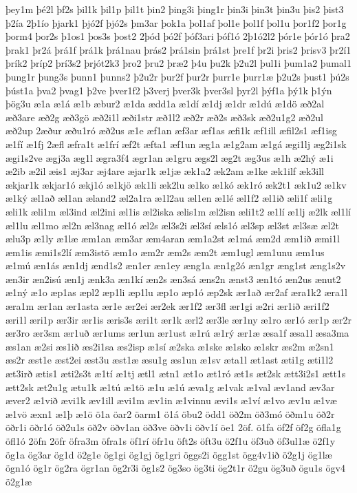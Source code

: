{þey1m
þé2l
þf2s
þil1k
þil1p
þil1t
þin2
þing3i
þing1r
þin3i
þin3t
þin3u
þis2
þist3
þ2ía
2þ1ío
þjark1
þjó2f
þjó2s
þm3ar
þok1a
þol1af
þol1e
þol1f
þol1u
þor1f2
þor1g
þorm4
þor2s
þ1os1
þos3s
þost2
2þód
þó2f
þóf3ari
þóf1ó
2þ1ó2l2
þór1e
þór1ó
þra2
þrak1
þr2á
þrá1f
þrá1k
þrá1nau
þrás2
þrá1sin
þrá1st
þre1f
þr2i
þris2
þrisv3
þr2í1
þrík2
þríp2
þrí3s2
þrjót2k3
þro2
þru2
þræ2
þ4u
þu2k
þ2u2l
þul1i
þum1a2
þumal1
þung1r
þung3s
þunn1
þunns2
þ2u2r
þur2f
þur2r
þurr1e
þurr1æ
þ2u2s
þust1
þú2s
þúst1a
þva2
þvag1
þ2ve
þver1f2
þ3verj
þver3k
þver3sl
þyr2l
þýf1a
þý1k
þ1ýn
þög3u
æ1a
æ1á
æ1b
æbur2
æ1da
ædd1a
æ1dí
æ1dj
æ1dr
æ1dú
æ1dö
æð2al
æð3are
æð2g
æð3gö
æð2i1l
æði1str
æð1l2
æð2r
æð2s
æð3sk
æð2u1g2
æð2ul
æð2up
2æður
æðu1ró
æð2us
æ1e
æf1an
æf3ar
æf1as
æfi1k
æf1ill
æfil2s1
æf1isg
æ1fí
æ1fj
2æfl
æfra1t
æ1frí
æf2t
æfta1
æf1un
æg1a
æ1g2am
æ1gá
ægi1lj
æg2i1sk
ægi1s2ve
ægj3a
æg1l
ægra3f4
ægr1an
æ1gru
ægs2l
æg2t
æg3us
æ1h
æ2hý
æ1i
æ2ib
æ2il
æis1
æj3ar
æj4are
æjar1k
æ1jæ
æk1a2
æk2am
æ1ke
æk1ilf
æk3ill
ækjar1k
ækjar1ó
ækj1ó
æ1kjö
æk1li
æk2lu
æ1ko
æ1kó
æk1ró
æk2t1
æk1u2
æ1kv
æ1ký
æl1að
æl1an
æland2
æl2a1ra
æ1l2au
æl1en
æ1lé
æl1f2
æl1ið
æli1f
æli1g
æli1k
æli1m
æl3ind
æl2ini
æl1is
æl2iska
ælis1m
æl2isn
æli1t2
æ1lí
æ1lj
æ2lk
æl1lí
æl1lu
æl1mo
æl2n
æl3nag
æl1ó
æl2s
æl3s2i
æl3sí
æls1ó
æl3sp
æl3st
æl3sæ
æl2t
ælu3p
æ1ly
æ1læ
æm1an
æm3ar
æm4aran
æm1a2st
æ1má
æm2d
æm1ið
æmi1l
æm1is
æmi1s2lí
æm3istö
æm1o
æm2r
æm2s
æm2t
æm1ugl
æm1unu
æm1us
æ1mú
æn1ás
æn1dj
ænd1s2
æn1er
æn1ey
æng1a
æn1g2ó
æn1gr
æng1st
æng1s2v
æn3ir
æn2isú
æn1j
ænk3a
æn1kí
æn2s
æn3sá
æns2n
ænst3
æn1tó
æn2us
ænut2
æ1ný
æ1o
æp1as
æpl2
æp1li
æp1lu
æp1o
æp1ó
æp2sk
ær1að
ær2af
æra1k2
æra1l
æra1m
ær1an
ær1asta
ær1e
ær2ei
ær2ek
ær1f2
ær3fl
ær1gi
æ2ri
ær1ið
æri1f2
æri1l
æri1p
ær3ir
ær1is
æris3s
æri1t
ær1k
ærl2
ær3le
ær1ny
æ1ro
ær1ó
ær1p
ær2r
ær3ro
ær3sm
ær1uð
ær1ums
ær1un
ær1ust
æ1rú
æ1rý
ær1æ
æsa1f
æsa1l
æsa3ma
æs1an
æ2si
æs1ið
æs2i1sa
æs2isp
æ1sí
æ2ska
æ1ske
æ1sko
æ1skr
æs2m
æ2sn1
æs2r
æst1e
æst2ei
æst3u
æst1æ
æsu1g
æs1un
æ1sv
æta1l
æt1ast
æti1g
æti1l2
æt3irð
ætis1
æti2s3t
æ1tí
æ1tj
ætl1
ætn1
æt1o
æt1ró
æt1s
æt2sk
ætt3i2s1
ætt1s
ætt2sk
æt2u1g
ætu1k
æ1tú
æ1tö
æ1u
æ1ú
æva1g
æ1vak
æ1val
æv1and
æv3ar
æver2
æ1við
ævi1k
æv1ill
ævi1m
æv1in
æ1vinnu
ævi1s
æ1ví
æ1vo
æv1u
æ1væ
æ1vö
æxn1
æ1þ
æ1ö
ö1a
öar2
öarm1
ö1á
öbu2
ödd1
öð2m
öð3mó
öðm1u
öð2r
öðr1i
öðr1ó
öð2u1s
öð2v
öðv1an
öð3ve
öðv1i
öðv1í
öe1
2öf.
ö1fa
öf2f
öf2g
öfla1g
öfl1ó
2öfn
2öfr
öfra3m
öfra1s
öf1rí
öfr1u
öft2s
öft3u
ö2f1u
öf3uð
öf3ul1æ
ö2f1y
ög1a
ög3ar
ög1d
ö2g1e
ög1gi
ög1gj
ög1gri
öggs2i
ögg1st
ögg4v1ið
ö2g1j
ög1læ
ögn1ó
ög1r
ög2ra
ögr1an
ög2r3i
ög1s2
ög3so
ög3ti
ög2t1r
ö2gu
ög3uð
ögu1s
ögv4
ö2g1æ
}
